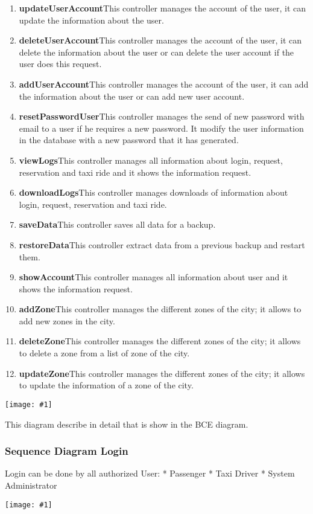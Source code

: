 \documentclass[11pt, a4paper,titlepage]{article}
\newcommand{\image}[1]{
	\begin{center}
		\noindent \texttt{[image: \#1]}
	\end{center}
	}
\begin{document}
\begin{enumerate}
	\begin{enumerate}
		\item \textbf{updateUserAccount}This controller manages the account of the user, it can update 
		the information about the user.
		\item \textbf{deleteUserAccount}This controller manages the account of the user, it can delete 
		the information about the user or can delete the user account if the user does this 
		request.
		\item \textbf{addUserAccount}This controller manages the account of the user, it can add 
		the information about the user or can add new user account.
		\item \textbf{resetPasswordUser}This controller manages the send of new password with email 
		to a user if he requires a new password. It modify the user information in the 
		database with a new password that it has generated.
		\item \textbf{viewLogs}This controller manages all information about login, request, 
		reservation and taxi ride and it shows the information request.
		\item \textbf{downloadLogs}This controller manages downloads of information about login, 
		request, reservation and taxi ride.
		\item \textbf{saveData}This controller saves all data for a backup.
		\item \textbf{restoreData}This controller extract data from a previous backup and restart them.
		\item \textbf{showAccount}This controller manages all information about user and it shows the 
		information request.
		\item \textbf{addZone}This controller manages the different zones of the city; it allows to add 
		new zones in the city.
		\item \textbf{deleteZone}This controller manages the different zones of the city; it allows to 
		delete a zone from a list of zone of the city.
		\item \textbf{updateZone}This controller manages the different zones of the city; it allows to 
		update  the information of a zone of the city.
	\end{enumerate}
\end{enumerate}
\image{BCESystemAdministrator.png}
\newpage

This diagram describe in detail that is show in the BCE diagram.
\subsubsection{Sequence Diagram Login}
  Login can be done by all authorized User:
	  * Passenger
	  * Taxi Driver
	  * System Administrator
\image{sequenceDiagramsLogin.png}
\newpage
\end{document}
